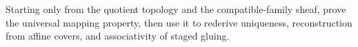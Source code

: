 \begin{problem}\label{chal:vi20-05}
Starting only from the quotient topology and the compatible-family sheaf, prove the universal mapping property, then use it to rederive uniqueness, reconstruction from affine covers, and associativity of staged gluing.
\end{problem}
